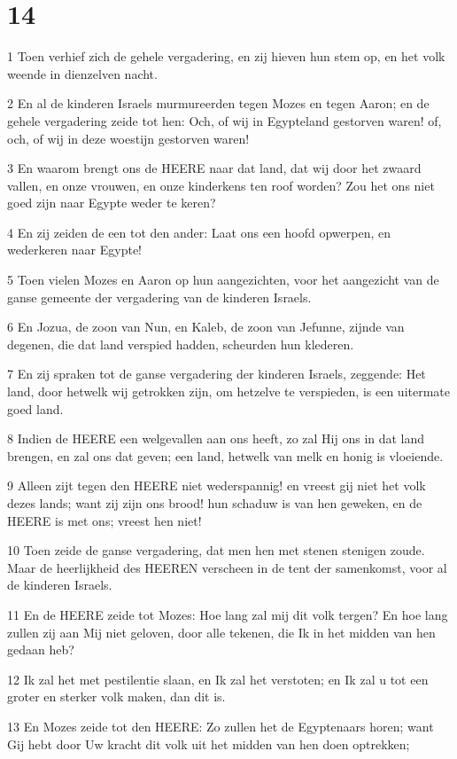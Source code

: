 \chapter{14}

\par 1 Toen verhief zich de gehele vergadering, en zij hieven hun stem op, en het volk weende in dienzelven nacht.
\par 2 En al de kinderen Israels murmureerden tegen Mozes en tegen Aaron; en de gehele vergadering zeide tot hen: Och, of wij in Egypteland gestorven waren! of, och, of wij in deze woestijn gestorven waren!
\par 3 En waarom brengt ons de HEERE naar dat land, dat wij door het zwaard vallen, en onze vrouwen, en onze kinderkens ten roof worden? Zou het ons niet goed zijn naar Egypte weder te keren?
\par 4 En zij zeiden de een tot den ander: Laat ons een hoofd opwerpen, en wederkeren naar Egypte!
\par 5 Toen vielen Mozes en Aaron op hun aangezichten, voor het aangezicht van de ganse gemeente der vergadering van de kinderen Israels.
\par 6 En Jozua, de zoon van Nun, en Kaleb, de zoon van Jefunne, zijnde van degenen, die dat land verspied hadden, scheurden hun klederen.
\par 7 En zij spraken tot de ganse vergadering der kinderen Israels, zeggende: Het land, door hetwelk wij getrokken zijn, om hetzelve te verspieden, is een uitermate goed land.
\par 8 Indien de HEERE een welgevallen aan ons heeft, zo zal Hij ons in dat land brengen, en zal ons dat geven; een land, hetwelk van melk en honig is vloeiende.
\par 9 Alleen zijt tegen den HEERE niet wederspannig! en vreest gij niet het volk dezes lands; want zij zijn ons brood! hun schaduw is van hen geweken, en de HEERE is met ons; vreest hen niet!
\par 10 Toen zeide de ganse vergadering, dat men hen met stenen stenigen zoude. Maar de heerlijkheid des HEEREN verscheen in de tent der samenkomst, voor al de kinderen Israels.
\par 11 En de HEERE zeide tot Mozes: Hoe lang zal mij dit volk tergen? En hoe lang zullen zij aan Mij niet geloven, door alle tekenen, die Ik in het midden van hen gedaan heb?
\par 12 Ik zal het met pestilentie slaan, en Ik zal het verstoten; en Ik zal u tot een groter en sterker volk maken, dan dit is.
\par 13 En Mozes zeide tot den HEERE: Zo zullen het de Egyptenaars horen; want Gij hebt door Uw kracht dit volk uit het midden van hen doen optrekken;
